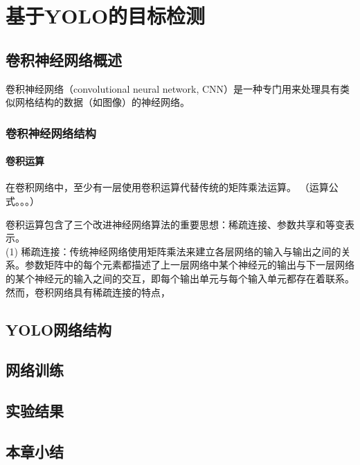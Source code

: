 
\chapter{基于YOLO的目标检测}

\section{卷积神经网络概述}
卷积神经网络（convolutional neural network, CNN）\cite{lecun1989}是一种专门用来处理具有类似网格结构的数据（如图像）的神经网络\cite{Goodfellow-et-al-2016}。
\subsection{卷积神经网络结构}
\subsubsection{卷积运算}
在卷积网络中，至少有一层使用卷积运算代替传统的矩阵乘法运算。
（运算公式。。。）

卷积运算包含了三个改进神经网络算法的重要思想：稀疏连接、参数共享和等变表示。\\
(1) 稀疏连接：传统神经网络使用矩阵乘法来建立各层网络的输入与输出之间的关系。参数矩阵中的每个元素都描述了上一层网络中某个神经元的输出与下一层网络的某个神经元的输入之间的交互，即每个输出单元与每个输入单元都存在着联系。然而，卷积网络具有稀疏连接的特点，


\section{YOLO网络结构}

\section{网络训练}

\section{实验结果}

\section{本章小结}






